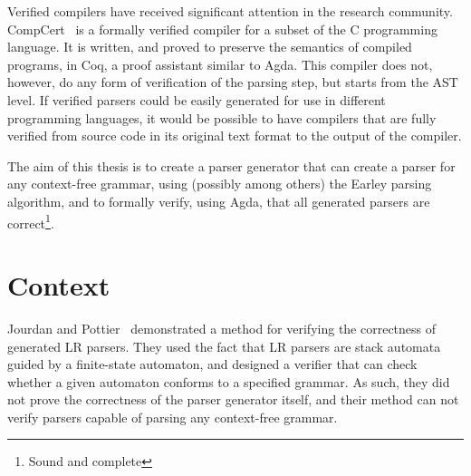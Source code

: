 \documentclass{article}
\begin{document}
	Verified compilers have received significant attention in the research
	community. CompCert~\cite{Leroy} is a formally verified compiler for a
	subset of the C programming language. It is written, and proved to preserve
	the semantics of compiled programs, in Coq, a proof assistant similar to
	Agda. This compiler does not, however, do any form of verification of the
	parsing step, but starts from the AST level. If verified parsers could be
	easily generated for use in different programming languages, it would be
	possible to have compilers that are fully verified from source code in its
	original text format to the output of the compiler.
	
	The aim of this thesis is to create a parser generator that can create a
	parser for any context-free grammar, using (possibly among others) the
	Earley parsing algorithm, and to formally verify, using Agda, that all
	generated parsers are correct\footnote{Sound and complete}. 
	



\section{Context}


	Jourdan and Pottier~\cite{Jourdan} demonstrated a method for verifying the
	correctness of generated LR parsers. They used the fact that LR parsers are
	stack automata guided by a finite-state automaton, and designed a verifier
	that can check whether a given automaton conforms to a specified grammar.
	As such, they did not prove the correctness of the parser generator itself,
	and their method can not verify parsers capable of parsing any context-free
	grammar.
	
\end{document}
